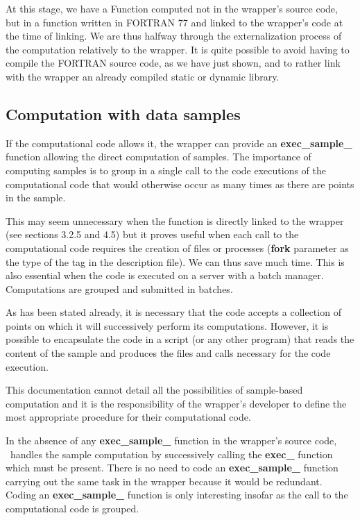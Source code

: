 At this stage, we have a Function computed not in the wrapper's source code, but in a function written in FORTRAN 77 and linked to the wrapper's code at the time of linking. We are thus halfway through the externalization process of the computation relatively to the wrapper. It is quite possible to avoid having to compile the FORTRAN source code, as we have just shown, and to rather link with the wrapper an already compiled static or dynamic library.

\subsection{Computation with data samples}

If the computational code allows it, the wrapper can provide an {\bf exec\_sample\_} function allowing the direct computation of samples. The importance of computing samples is to group in a single call to the code executions of the computational code that would otherwise occur as many times as there are points in the sample.

This may seem unnecessary when the function is directly linked to the wrapper (see sections 3.2.5 and 4.5) but it proves useful when each call to the computational code requires the creation of files or processes ({\bf fork} parameter as the type of the {\bf <wrap-mode>} tag in the description file). We can thus save much time. This is also essential when the code is executed on a server with a batch manager. Computations are grouped and submitted in batches.

As has been stated already, it is necessary that the code accepts a collection of points on which it will successively perform its computations. However, it is possible to encapsulate the code in a script (or any other program) that reads the content of the sample and produces the files and calls necessary for the code execution.

This documentation cannot detail all the possibilities of sample-based computation and it is the responsibility of the wrapper's developer to define the most appropriate procedure for their computational code.

In the absence of any {\bf exec\_sample\_} function in the wrapper's source code, \OT\ handles the sample computation by successively calling the {\bf exec\_} function which must be present. There is no need to code an {\bf exec\_sample\_} function carrying out the same task in the wrapper because it would be redundant. Coding an {\bf exec\_sample\_} function is only interesting insofar as the call to the computational code is grouped.


